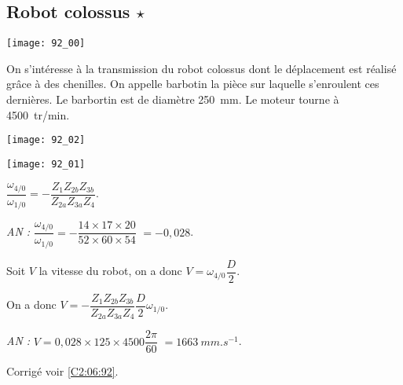 \normaltrue \difficilefalse \tdifficilefalse
\correctionfalse


\subsection*{Robot colossus $\star$ \label{C2:06:92}}
\setcounter{question}{0}


\ifcorrection
\else
{}
\fi

\ifprof
\else


\begin{marginfigure}
\texttt{[image: 92\_00]}
\end{marginfigure}
On s'intéresse à la transmission du robot colossus dont le déplacement est réalisé grâce à des chenilles. On appelle barbotin la pièce sur laquelle s'enroulent ces dernières. Le barbortin est de diamètre \SI{250}{mm}.
Le moteur tourne à \SI{4500}{tr/min}.

\begin{marginfigure}
\texttt{[image: 92\_02]}
\end{marginfigure}

\begin{center}
\texttt{[image: 92\_01]}
\end{center}


\fi




\ifprof
\begin{corrige}
$\dfrac{\omega_{4/0}}{\omega_{1/0}}  = - \dfrac{Z_1 Z_{2b}Z_{3b}}{Z_{2a}Z_{3a}Z_{4}}$.

\textit{AN :} $\dfrac{\omega_{4/0}}{\omega_{1/0}}  = - \dfrac{14\times  17 \times 20}{52 \times 60 \times 54}$ $= - 0,028$.
\end{corrige}
\else
\fi




\ifprof
\begin{corrige}
Soit $V$ la vitesse du robot, on a donc $V = \omega_{4/0} \dfrac{D}{2}$.

On a donc $V = - \dfrac{Z_1 Z_{2b}Z_{3b}}{Z_{2a}Z_{3a}Z_{4}}  \dfrac{D}{2} \omega_{1/0}$.

\textit{AN :} $V = 0,028 \times 125 \times 4500\dfrac{2\pi}{60}$ $=\SI{1663}{mm.s^{-1}}$. 
\end{corrige}
\else
\fi





\ifprof
\else
\begin{flushright}
\footnotesize{Corrigé  voir \ref{C2:06:92}.}
\end{flushright}%
\fi